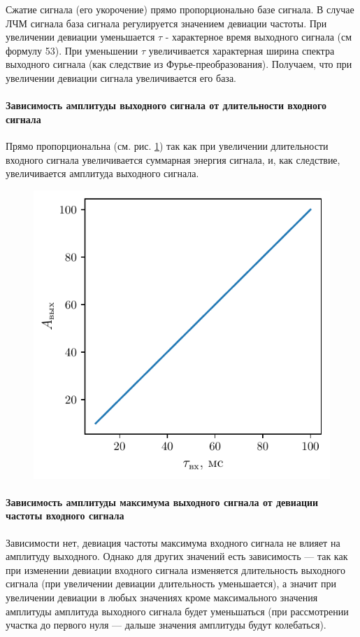 Сжатие сигнала (его укорочение) прямо пропорционально базе сигнала. В случае
ЛЧМ сигнала база сигнала регулируется значением девиации частоты.  При
увеличении девиации уменьшается $\tau$ - характерное время выходного сигнала (см
формулу 53). При уменьшении $\tau$ увеличивается характерная ширина спектра
выходного сигнала (как следствие из Фурье-преобразования). Получаем, что при
увеличении девиации сигнала увеличивается его база.



\paragraph{Зависимость амплитуды выходного сигнала от длительности входного сигнала}%

Прямо пропорциональна (см. рис. \ref{fig:3.2}) так как при увеличении длительности
входного сигнала увеличивается суммарная энергия сигнала, и, как следствие,
увеличивается амплитуда выходного сигнала.

\begin{figure}[H]
    \centering
    \includegraphics[width=0.6\linewidth]{imgs/task3/t3f1}
    \caption{}
    \label{fig:3.2}
\end{figure}

\paragraph{Зависимость амплитуды максимума выходного сигнала от девиации частоты входного сигнала}%
Зависимости нет, девиация частоты максимума входного сигнала не влияет на
амплитуду выходного.  Однако для других значений есть зависимость — так как при
изменении девиации входного сигнала изменяется длительность выходного сигнала
(при увеличении девиации длительность уменьшается), а значит при увеличении
девиации в любых значениях кроме максимального значения амплитуды амплитуда
выходного сигнала будет уменьшаться (при рассмотрении участка до первого нуля —
дальше значения амплитуды будут колебаться). 


